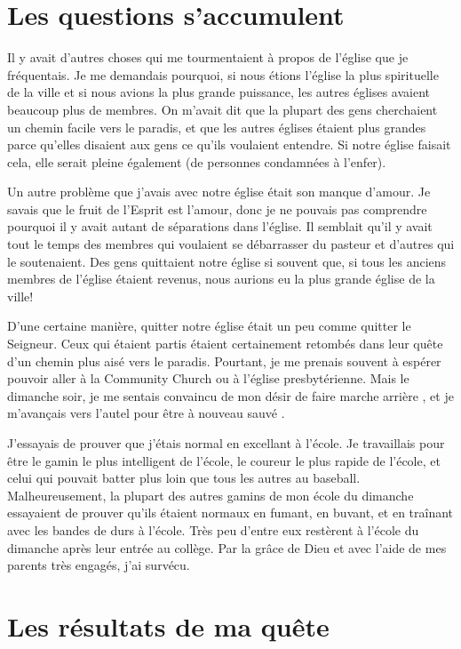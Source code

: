 \section{Les questions s'accumulent}

Il y avait d'autres choses qui me tourmentaient à propos de l'église que je fréquentais. Je me demandais pourquoi, si nous étions l'église la plus spirituelle de la ville et si nous avions la plus grande puissance, les autres églises avaient beaucoup plus de membres. On m'avait dit que la plupart des gens cherchaient un chemin facile vers le paradis, et que les autres églises étaient plus grandes parce qu'elles disaient aux gens ce qu'ils voulaient entendre. Si notre église faisait cela, elle serait pleine également (de personnes condamnées à l'enfer).

Un autre problème que j'avais avec notre église était son manque d'amour. Je savais que le fruit de l'Esprit est l'amour, donc je ne pouvais pas comprendre pourquoi il y avait autant de séparations dans l'église. Il semblait qu'il y avait tout le temps des membres qui voulaient se débarrasser du pasteur et d'autres qui le soutenaient. Des gens quittaient notre église si souvent que, si tous les anciens membres de l'église étaient revenus, nous aurions eu la plus grande église de la ville!

D'une certaine manière, quitter notre église était un peu comme quitter le Seigneur. Ceux qui étaient partis étaient certainement retombés dans leur quête d'un chemin plus aisé vers le paradis. Pourtant, je me prenais souvent à espérer pouvoir aller à la Community Church ou à l'église presbytérienne. Mais le dimanche soir, je me sentais convaincu de mon désir de \og faire marche arrière \fg{}, et je m'avançais vers l'autel pour être à nouveau \og sauvé \fg{}.

J'essayais de prouver que j'étais normal en excellant à l'école. Je travaillais pour être le gamin le plus intelligent de l'école, le coureur le plus rapide de l'école, et celui qui pouvait batter plus loin que tous les autres au baseball. Malheureusement, la plupart des autres gamins de mon école du dimanche essayaient de prouver qu'ils étaient normaux en fumant, en buvant, et en traînant avec les bandes de durs à l'école. Très peu d'entre eux restèrent à l'école du dimanche après leur entrée au collège. Par la grâce de Dieu et avec l'aide de mes parents très engagés, j'ai survécu.

\section{Les résultats de ma quête}

